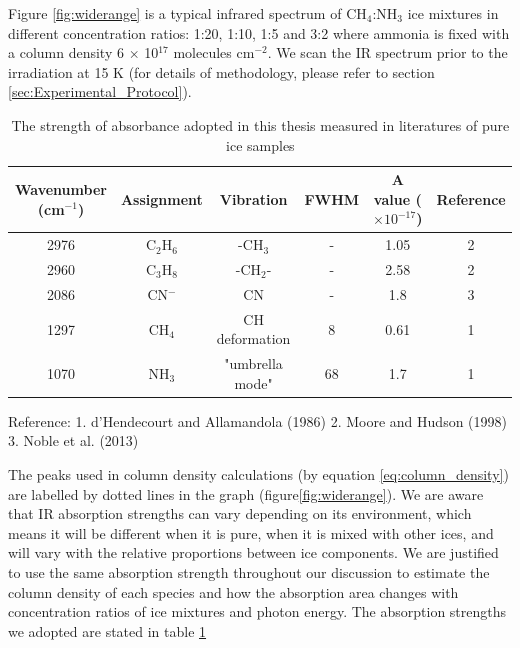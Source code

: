 Figure \ref{fig:widerange} is a typical infrared spectrum of CH$_4$:NH$_3$ ice mixtures in different concentration ratios: 1:20, 1:10, 1:5 and 3:2 where ammonia is fixed with a column density 6 $\times$ 10$^{17}$ molecules cm$^{-2}$. We scan the IR spectrum prior to the irradiation at 15 K (for details of methodology, please refer to section \ref{sec:Experimental_Protocol}).\\

\begin{table}[htbp]
\caption{The strength of absorbance adopted in this thesis measured in literatures of pure ice samples}
\label{tab:Absorbance}
\begin{tabular}{cccccc}
\hline
\hline
Wavenumber (cm$^{-1}$) & Assignment  & Vibration & FWHM & A value ($\times 10^{-17}$) & Reference \\
\hline
2976 &  C$_2$H$_6$ & -CH$_3$ & - & 1.05 & 2 \\
2960 & C$_3$H$_8$ & -CH$_2$- & - & 2.58 & 2 \\
2086 & CN$^-$ & CN & - & 1.8 & 3 \\
1297 & CH$_4$ & CH deformation & 8 & 0.61 & 1 \\
1070 & NH$_3$ & "umbrella mode" & 68 & 1.7 & 1 \\
\hline
\end{tabular}
Reference: 1. d'Hendecourt and Allamandola (1986)\cite{d1986time} 2. Moore and Hudson (1998)\cite{moore1998infrared} 3. Noble et al. (2013) \cite{noble2012thermal}
\end{table}

The peaks used in column density calculations (by equation \ref{eq:column_density}) are labelled by dotted lines in the graph (figure\ref{fig:widerange}). We are aware that IR absorption strengths can vary depending on its environment, which means it will be different when it is pure, when it is mixed with other ices, and will vary with the relative proportions between ice components. We are justified to use the same absorption strength throughout our discussion to estimate the column density of each species and how the absorption area changes with concentration ratios of ice mixtures and photon energy. The absorption strengths we adopted are stated in table \ref{tab:Absorbance} \\

